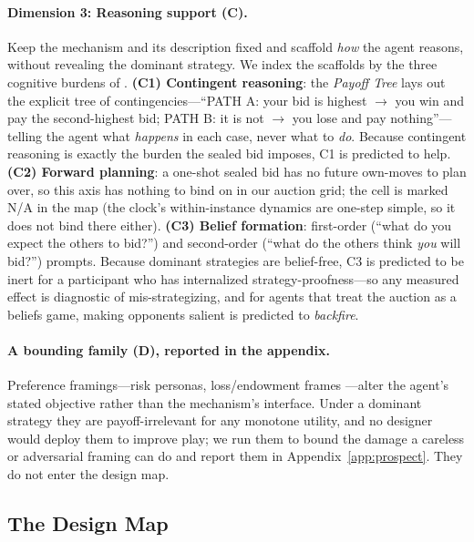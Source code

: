 \paragraph{Dimension 3: Reasoning support (C).}
Keep the mechanism and its description fixed and scaffold \emph{how} the agent reasons, without revealing the dominant strategy. We index the scaffolds by the three cognitive burdens of \citet{li2024designing}. \textbf{(C1) Contingent reasoning}: the \emph{Payoff Tree} lays out the explicit tree of contingencies---``PATH A: your bid is highest $\to$ you win and pay the second-highest bid; PATH B: it is not $\to$ you lose and pay nothing''---telling the agent what \emph{happens} in each case, never what to \emph{do}. Because contingent reasoning is exactly the burden the sealed bid imposes, C1 is predicted to help. \textbf{(C2) Forward planning}: a one-shot sealed bid has no future own-moves to plan over, so this axis has nothing to bind on in our auction grid; the cell is marked N/A in the map (the clock's within-instance dynamics are one-step simple, so it does not bind there either). \textbf{(C3) Belief formation}: first-order (``what do you expect the others to bid?'') and second-order (``what do the others think \emph{you} will bid?'') prompts. Because dominant strategies are belief-free, C3 is predicted to be inert for a participant who has internalized strategy-proofness---so any measured effect is diagnostic of mis-strategizing, and for agents that treat the auction as a beliefs game, making opponents salient is predicted to \emph{backfire}.

\paragraph{A bounding family (D), reported in the appendix.}
Preference framings---risk personas, loss/endowment frames \citep{kahneman1979prospect, dreyfuss2022expectations}---alter the agent's stated objective rather than the mechanism's interface. Under a dominant strategy they are payoff-irrelevant for any monotone utility, and no designer would deploy them to improve play; we run them to bound the damage a careless or adversarial framing can do and report them in Appendix~\ref{app:prospect}. They do not enter the design map.

\subsection{The Design Map}\label{sec:theory-map}

